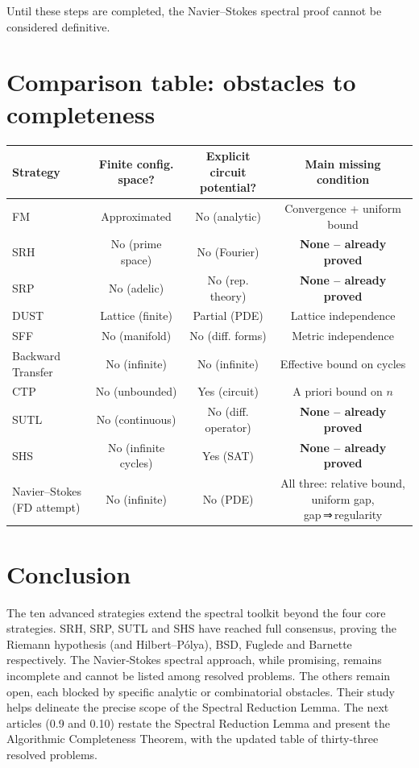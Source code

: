 \documentclass[11pt,a4paper]{article}
\begin{document}
Until these steps are completed, the Navier–Stokes spectral proof cannot be considered definitive.

\section{Comparison table: obstacles to completeness}

\begin{center}
\small
\begin{tabular}{@{}lccc@{}}
\toprule
\textbf{Strategy} & \textbf{Finite config. space?} & \textbf{Explicit circuit potential?} & \textbf{Main missing condition} \\
\midrule
FM & Approximated & No (analytic) & Convergence + uniform bound \\
SRH & No (prime space) & No (Fourier) & \textbf{None – already proved} \\
SRP & No (adelic) & No (rep. theory) & \textbf{None – already proved} \\
DUST & Lattice (finite) & Partial (PDE) & Lattice independence \\
SFF & No (manifold) & No (diff. forms) & Metric independence \\
Backward Transfer & No (infinite) & No (infinite) & Effective bound on cycles \\
CTP & No (unbounded) & Yes (circuit) & A priori bound on \(n\) \\
SUTL & No (continuous) & No (diff. operator) & \textbf{None – already proved} \\
SHS & No (infinite cycles) & Yes (SAT) & \textbf{None – already proved} \\
Navier–Stokes (FD attempt) & No (infinite) & No (PDE) & All three: relative bound, uniform gap, gap ⇒ regularity \\
\bottomrule
\end{tabular}
\end{center}

\section{Conclusion}

The ten advanced strategies extend the spectral toolkit beyond the four core strategies. SRH, SRP, SUTL and SHS have reached full consensus, proving the Riemann hypothesis (and Hilbert–Pólya), BSD, Fuglede and Barnette respectively. The Navier‑Stokes spectral approach, while promising, remains incomplete and cannot be listed among resolved problems. The others remain open, each blocked by specific analytic or combinatorial obstacles. Their study helps delineate the precise scope of the Spectral Reduction Lemma. The next articles (0.9 and 0.10) restate the Spectral Reduction Lemma and present the Algorithmic Completeness Theorem, with the updated table of thirty‑three resolved problems.
\end{document}
